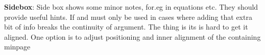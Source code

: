 \documentclass[12pt, a4paper]{article}
\begin{document}

\vspace*{1cm}

\begin{minipage}[t][][t]{.6\textwidth}%
	\textbf{Sidebox}: Side box shows some minor notes, for.eg in equations etc. They should provide useful hints. If and must only be used in cases where adding that extra bit of info breaks the continuity of argument. The thing is its is hard to get it aligned. One option is to adjust positioning and inner alignment of the containing minpage
\end{minipage}%
\hfill%
\begin{minipage}[t][][b]{6cm}%
\end{minipage}
\end{document}
